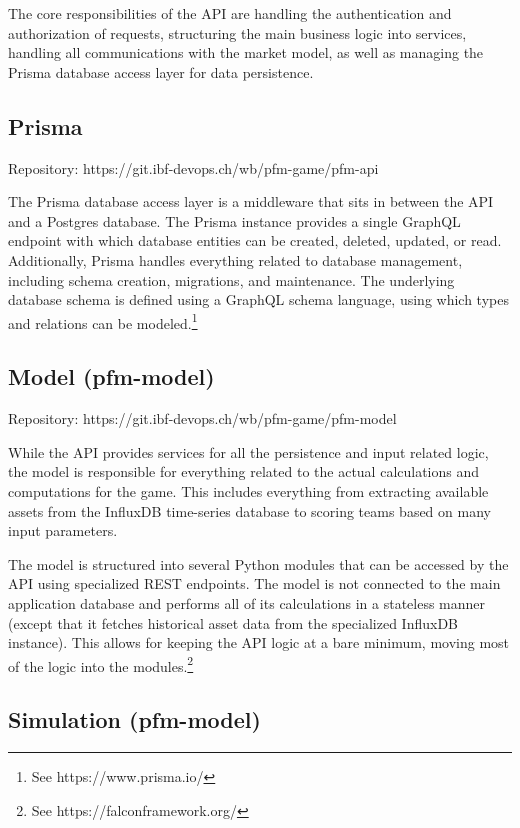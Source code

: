 The core responsibilities of the API are handling the authentication and authorization of requests, structuring the main business logic into services, handling all communications with the market model, as well as managing the Prisma database access layer for data persistence.


\subsection{Prisma}

Repository: https://git.ibf-devops.ch/wb/pfm-game/pfm-api

The Prisma database access layer is a middleware that sits in between the API and a Postgres database. The Prisma instance provides a single GraphQL endpoint with which database entities can be created, deleted, updated, or read. Additionally, Prisma handles everything related to database management, including schema creation, migrations, and maintenance. The underlying database schema is defined using a GraphQL schema language, using which types and relations can be modeled.\footnote{See https://www.prisma.io/}


\subsection{Model (pfm-model)}

Repository: https://git.ibf-devops.ch/wb/pfm-game/pfm-model

While the API provides services for all the persistence and input related logic, the model is responsible for everything related to the actual calculations and computations for the game. This includes everything from extracting available assets from the InfluxDB time-series database to scoring teams based on many input parameters.

The model is structured into several Python modules that can be accessed by the API using specialized REST endpoints. The model is not connected to the main application database and performs all of its calculations in a stateless manner (except that it fetches historical asset data from the specialized InfluxDB instance). This allows for keeping the API logic at a bare minimum, moving most of the logic into the modules.\footnote{See https://falconframework.org/}


\subsection{Simulation (pfm-model)}

